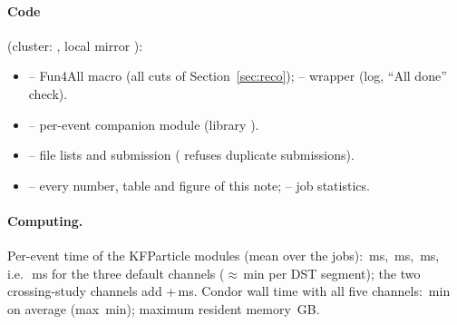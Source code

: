 
\paragraph{Code} (cluster: , local mirror
):
\begin{itemize}\setlength\itemsep{0pt}
\item {} -- Fun4All macro (all cuts of Section~\ref{sec:reco});
   -- wrapper (log, ``All done'' check).
\item {} -- per-event companion module (library ).
\item {} -- file lists and submission ( refuses duplicate submissions).
\item {} -- every number, table and figure of this
  note;  -- job statistics.
\end{itemize}

\paragraph{Computing.} Per-event time of the KFParticle modules (mean over the
\nKFPlogs{} jobs): \Ks{} \msPerEvKs\,ms, \Lam{} \msPerEvLambda\,ms, \Dzero{} \msPerEvDzero\,ms,
i.e.\ \msPerEvProd\,ms for the three default channels ($\approx$\minPerFileProd\,min per DST
segment); the two crossing-study channels add \msPerEvKsNoX{}+\msPerEvLambdaNoX\,ms. Condor
wall time with all five channels: \condorWallMin\,min on average (max \condorWallMaxMin\,min);
maximum resident memory \maxRSSGB\,GB.
